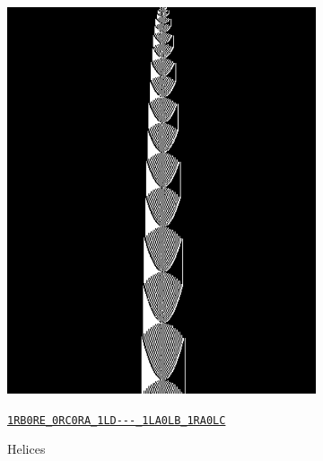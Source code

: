 \documentclass[a4paper,british]{article}
\theoremstyle{definition} %
\numberwithin{equation}{section}
\theoremstyle{definition} %
\newcommand{\tm}[1]{\href{https://bbchallenge.org/#1}{\texttt{\nolinkurl{#1}}}}
\begin{document}
\begin{figure}[htbp]
\begin{subfigure}{0.3\textwidth}
        \includegraphics[width=\linewidth]{figures/zoology/helices_1RB0RE_0RC0RA_1LD---_1LA0LB_1RA0LC.png}
        \caption*{Helices}
        {\scriptsize \tm{1RB0RE_0RC0RA_1LD---_1LA0LB_1RA0LC}}
    \end{subfigure}
    \hfill
    \begin{subfigure}{0.3\textwidth}
        \centering

\end{subfigure}
\end{figure}
\end{document}
